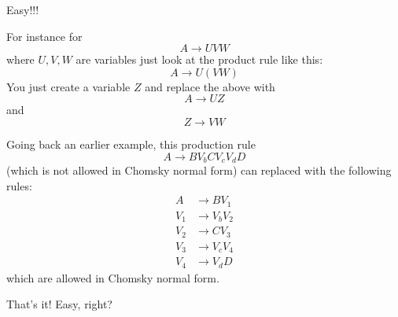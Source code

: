 Easy!!!

For instance for 
\[
A \rightarrow UVW
\]
where $U,V,W$ are variables just look at the product rule like this:
\[
A \rightarrow U(VW)
\]
You just create a variable $Z$ and replace the above with
\[
A \rightarrow UZ
\]
and
\[
Z \rightarrow VW
\]

Going back an earlier example, this production rule
\[
A \rightarrow BV_bCV_cV_dD
\] 
(which is not allowed in Chomsky normal form)
can replaced with the following rules:
\begin{align*}
A &\rightarrow BV_1 \\
V_1 &\rightarrow V_b V_2 \\
V_2 &\rightarrow C V_3 \\
V_3 &\rightarrow V_c V_4 \\
V_4 &\rightarrow V_d D
\end{align*}
which are allowed in Chomsky normal form.

That's it! Easy, right? 

\newpage


